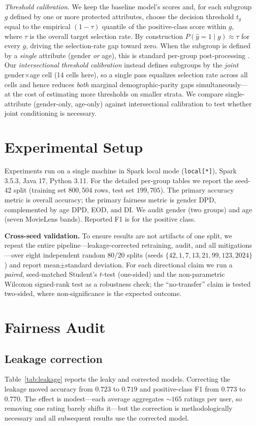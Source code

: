 \documentclass[conference]{IEEEtran}
\begin{document}
\emph{Threshold calibration.} We keep the baseline model's scores and, for each subgroup
$g$ defined by one or more protected attributes, choose the decision threshold $t_g$ equal
to the empirical $(1-\tau)$ quantile of the positive-class score within $g$, where $\tau$
is the overall target selection rate. By construction $P(\hat y=1\mid g)\approx\tau$ for
every $g$, driving the selection-rate gap toward zero. When the subgroup is defined by a
\emph{single} attribute (gender \emph{or} age), this is standard per-group post-processing
\cite{hardt2016equality}. Our \emph{intersectional threshold calibration} instead defines
subgroups by the \emph{joint} gender$\times$age cell (14 cells here), so a single pass
equalizes selection rate across all cells and hence reduces \emph{both} marginal
demographic-parity gaps simultaneously---at the cost of estimating more thresholds on
smaller strata. We compare single-attribute (gender-only, age-only) against intersectional
calibration to test whether joint conditioning is necessary.

\section{Experimental Setup}\label{sec:setup}
Experiments run on a single machine in Spark local mode (\texttt{local[*]}),
Spark 3.5.3, Java 17, Python 3.11. For the detailed per-group tables we report the
seed-42 split (training set $800{,}504$ rows, test set $199{,}705$). The primary
accuracy metric is overall accuracy; the primary fairness metric is gender DPD,
complemented by age DPD, EOD, and DI. We audit gender (two groups) and age (seven
MovieLens bands). Reported F1 is for the positive class.

\textbf{Cross-seed validation.} To ensure results are not artifacts of one split, we
repeat the entire pipeline---leakage-corrected retraining, audit, and all
mitigations---over eight independent random 80/20 splits (seeds
$\{42,1,7,13,21,99,123,2024\}$) and report mean$\pm$standard deviation. For each
directional claim we run a \emph{paired}, seed-matched Student's $t$-test (one-sided) and
the non-parametric Wilcoxon signed-rank test as a robustness check; the ``no-transfer''
claim is tested two-sided, where non-significance is the expected outcome.

\section{Fairness Audit}\label{sec:audit}
\subsection{Leakage correction}
Table~\ref{tab:leakage} reports the leaky and corrected models. Correcting the
leakage moved accuracy from $0.723$ to $0.719$ and positive-class F1 from $0.773$ to
$0.770$. The effect is modest---each average aggregates ${\sim}165$ ratings per user,
so removing one rating barely shifts it---but the correction is methodologically
necessary and all subsequent results use the corrected model.
\end{document}

